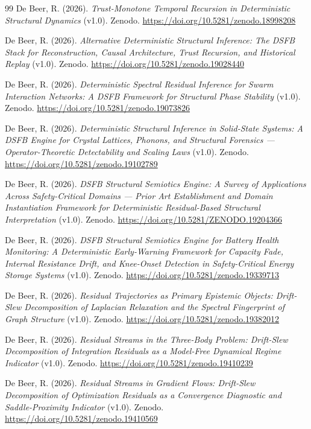\documentclass[11pt,letterpaper]{article}
\theoremstyle{scresult}
\begin{document}
\begin{thebibliography}{99}
De Beer, R. (2026).
\textit{Trust-Monotone Temporal Recursion in Deterministic Structural Dynamics}
(v1.0). Zenodo. \url{https://doi.org/10.5281/zenodo.18998208}

De Beer, R. (2026).
\textit{Alternative Deterministic Structural Inference: The DSFB Stack for
Reconstruction, Causal Architecture, Trust Recursion, and Historical Replay}
(v1.0). Zenodo. \url{https://doi.org/10.5281/zenodo.19028440}

De Beer, R. (2026).
\textit{Deterministic Spectral Residual Inference for Swarm Interaction
Networks: A DSFB Framework for Structural Phase Stability} (v1.0). Zenodo.
\url{https://doi.org/10.5281/zenodo.19073826}

De Beer, R. (2026).
\textit{Deterministic Structural Inference in Solid-State Systems: A DSFB
Engine for Crystal Lattices, Phonons, and Structural Forensics --- Operator-Theoretic
Detectability and Scaling Laws} (v1.0). Zenodo.
\url{https://doi.org/10.5281/zenodo.19102789}

De Beer, R. (2026).
\textit{DSFB Structural Semiotics Engine: A Survey of Applications Across
Safety-Critical Domains --- Prior Art Establishment and Domain Instantiation
Framework for Deterministic Residual-Based Structural Interpretation} (v1.0).
Zenodo. \url{https://doi.org/10.5281/ZENODO.19204366}

De Beer, R. (2026).
\textit{DSFB Structural Semiotics Engine for Battery Health Monitoring: A
Deterministic Early-Warning Framework for Capacity Fade, Internal Resistance
Drift, and Knee-Onset Detection in Safety-Critical Energy Storage Systems}
(v1.0). Zenodo. \url{https://doi.org/10.5281/zenodo.19339713}

De Beer, R. (2026).
\textit{Residual Trajectories as Primary Epistemic Objects: Drift-Slew
Decomposition of Laplacian Relaxation and the Spectral Fingerprint of Graph
Structure} (v1.0). Zenodo. \url{https://doi.org/10.5281/zenodo.19382012}

De Beer, R. (2026).
\textit{Residual Streams in the Three-Body Problem: Drift-Slew Decomposition
of Integration Residuals as a Model-Free Dynamical Regime Indicator} (v1.0).
Zenodo. \url{https://doi.org/10.5281/zenodo.19410239}

De Beer, R. (2026).
\textit{Residual Streams in Gradient Flows: Drift-Slew Decomposition of
Optimization Residuals as a Convergence Diagnostic and Saddle-Proximity
Indicator} (v1.0). Zenodo. \url{https://doi.org/10.5281/zenodo.19410569}


\end{thebibliography}
\end{document}
